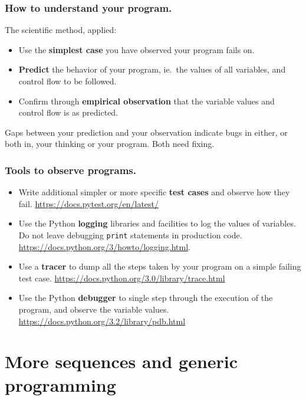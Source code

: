 \documentclass{beamer} %
\newcommand\emc[1]{\textcolor{brightblue}{\textbf{#1}}}
\begin{document}
\begin{frame}
\frametitle{How to understand your program.}

The scientific method, applied:
\begin{itemize}
	\item Use the \emc{simplest case} you have observed your program fails on.
	\item \emc{Predict} the behavior of your program, ie.\ the values of all variables, and control flow to be followed.
	\item Confirm through \emc{empirical observation} that the variable values and control flow is as predicted.
\end{itemize}

\vspace{3mm}
Gaps between your prediction and your observation indicate bugs in either, or both in, your thinking or your program. Both need fixing.

\end{frame}

\begin{frame}
\frametitle{Tools to observe programs.}

\begin{itemize}
\item Write additional simpler or more specific \emc{test cases} and observe how they fail. \url{https://docs.pytest.org/en/latest/}
\item Use the Python \emc{logging} libraries and facilities to log the values of variables. Do not leave debugging \texttt{print} statements in production code. \url{https://docs.python.org/3/howto/logging.html}.
\item Use a \emc{tracer} to dump all the steps taken by your program on a simple failing test case. \url{https://docs.python.org/3.0/library/trace.html}
\item Use the Python \emc{debugger} to single step through the execution of the program, and observe the variable values. \url{https://docs.python.org/3.2/library/pdb.html}
\end{itemize}

\end{frame}

\section{More sequences and generic programming}
\end{document}
